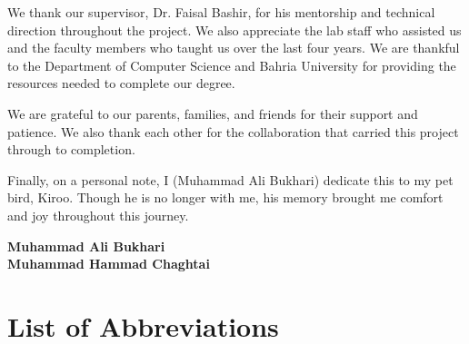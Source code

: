 \documentclass[11pt,a4paper,oneside,openright]{report}
\begin{document}
We thank our supervisor, Dr. Faisal Bashir, for his mentorship and technical direction throughout the project. We also appreciate the lab staff who assisted us and the faculty members who taught us over the last four years. We are thankful to the Department of Computer Science and Bahria University for providing the resources needed to complete our degree.

We are grateful to our parents, families, and friends for their support and patience. We also thank each other for the collaboration that carried this project through to completion.

Finally, on a personal note, I (Muhammad Ali Bukhari) dedicate this to my pet bird, Kiroo. Though he is no longer with me, his memory brought me comfort and joy throughout this journey.

\vspace{1cm}
\begin{flushright}
    \textbf{Muhammad Ali Bukhari}\\[0.5cm]
    \textbf{Muhammad Hammad Chaghtai}
\end{flushright}

\newpage
\tableofcontents

\newpage
{}
{}
\listoffigures

\newpage
{}
{}
\listoftables

\newpage
{}
{}
\chapter*{List of Abbreviations}
\end{document}
